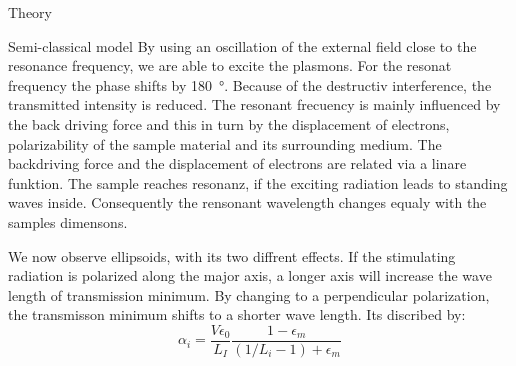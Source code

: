\documentclass[pdftex, a4paper,11pt, twoside, ngerman]{report}
\begin{document}
\begin{chapter}{Theory}
\begin{section}{Semi-classical model}
        By using an oscillation of the external field close to the resonance frequency, we are able to excite the plasmons.
        For the resonat frequency the phase shifts by \SI{180}{\degree}.
        Because of the destructiv interference, the transmitted intensity is reduced.
        The resonant frecuency is mainly influenced by the back driving force and this in turn by the displacement of electrons, polarizability of the sample material and its surrounding medium.
        The backdriving force and the displacement of electrons are related via a linare funktion.
        The sample reaches resonanz, if the exciting radiation leads to standing waves inside. 
        Consequently the rensonant wavelength changes equaly with the samples dimensons.  

        We now observe ellipsoids, with its two diffrent effects.
        If the stimulating radiation is polarized along the major axis, a longer axis will increase the wave length of transmission minimum.
        By changing to a perpendicular polarization, the transmisson minimum shifts to a shorter wave length.
        Its discribed by:
        \[ 
            \alpha_i = \frac{V\epsilon_0}{L_I}\frac{1-\epsilon_m}{(1/L_i-1)+\epsilon_m}
        \]


    \end{section}



  \end{chapter}
         
         
         
\end{document}
